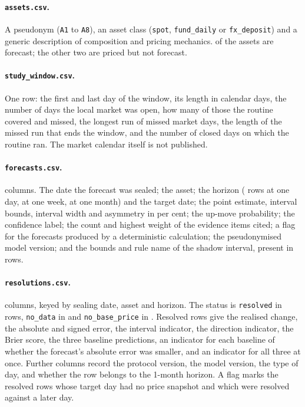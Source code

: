 \documentclass[11pt,a4paper]{article}
\begin{document}
\paragraph{\texttt{assets.csv}.} A pseudonym (\texttt{A1} to \texttt{A8}), an
asset class (\texttt{spot}, \texttt{fund\_daily} or \texttt{fx\_deposit}) and a
generic description of composition and pricing mechanics. \NumForecastAssets{}
of the \NumAssets{} assets are forecast; the other two are priced but not
forecast.

\paragraph{\texttt{study\_window.csv}.} One row: the first and last day of the
window, its length in calendar days, the number of days the local market was
open, how many of those the routine covered and missed, the longest run of
missed market days, the length of the missed run that ends the window, and
the number of closed days on which the routine ran. The market calendar
itself is not published.

\paragraph{\texttt{forecasts.csv}.} \NumForecastCols{} columns. The date the
forecast was sealed; the asset; the horizon (\NumOneDay{} rows at one day,
\NumOneWeek{} at one week, \NumOneMonth{} at one month) and the target date;
the point estimate, interval bounds, interval width and asymmetry in per cent;
the up-move probability; the confidence label; the count and highest weight
of the evidence items cited; a flag for the \NumMechanical{} forecasts
produced by a deterministic calculation; the pseudonymised model version; and
the bounds and rule name of the shadow interval, present in \NumShadowRows{}
rows.

\paragraph{\texttt{resolutions.csv}.} \NumResolutionCols{} columns, keyed by
sealing date, asset and horizon. The status is \texttt{resolved} in
\NumResolved{} rows, \texttt{no\_data} in \NumNoData{} and
\texttt{no\_base\_price} in \NumNoBase. Resolved rows give the realised change,
the absolute and signed error, the interval indicator, the direction
indicator, the Brier score, the three baseline predictions, an indicator for
each baseline of whether the forecast's absolute error was smaller, and an
indicator for all three at once. Further columns record the protocol version,
the model version, the type of day, and whether the row belongs to the
1-month horizon. A flag marks the \NumDirty{} resolved rows whose target day
had no price snapshot and which were resolved against a later day.
\end{document}
